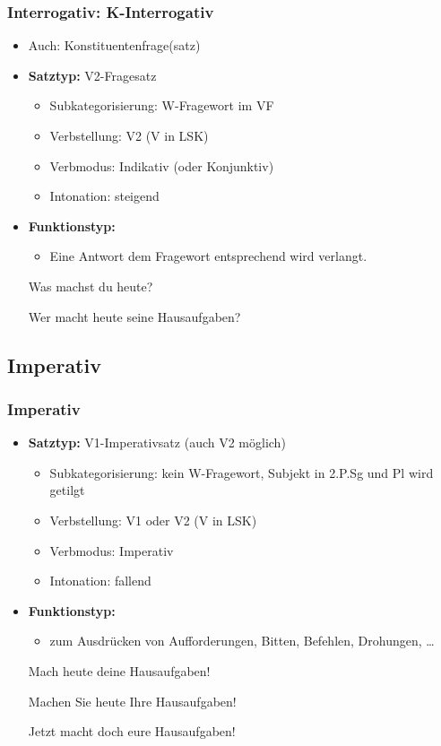 \begin{frame}
\frametitle{Interrogativ: K-Interrogativ}

\begin{itemize}
	\item Auch: Konstituentenfrage(satz)
	\item \textbf{Satztyp:} V2-Fragesatz
	\begin{itemize}
		\item Subkategorisierung: W-Fragewort im VF
		\item Verbstellung: V2 (V in LSK)
		\item Verbmodus: Indikativ (oder Konjunktiv)
		\item Intonation: steigend
	\end{itemize}
	\item \textbf{Funktionstyp:}
	\begin{itemize}
		\item Eine Antwort dem Fragewort entsprechend wird verlangt.
	\end{itemize}
	
	\ea Was machst du heute?
	\z
	
	\ea Wer macht heute seine Hausaufgaben?
	\z
	
\end{itemize}

\end{frame}


\subsection{Imperativ}


\begin{frame}
\frametitle{Imperativ}

\begin{itemize}
	\item \textbf{Satztyp:} V1-Imperativsatz (auch V2 möglich)
	\begin{itemize}
		\item Subkategorisierung: kein W-Fragewort, Subjekt in 2.P.Sg und Pl wird getilgt
		\item Verbstellung: V1 oder V2 (V in LSK)
		\item Verbmodus: Imperativ
		\item Intonation: fallend
	\end{itemize}
	\item \textbf{Funktionstyp:}
	\begin{itemize}
		\item zum Ausdrücken von Aufforderungen, Bitten, Befehlen, Drohungen, \dots
	\end{itemize}
	
	\ea Mach heute deine Hausaufgaben!
	\z
	
	\ea Machen Sie heute Ihre Hausaufgaben!
	\z
	
	\ea Jetzt macht doch eure Hausaufgaben!
	\z
	
\end{itemize}

\end{frame}


